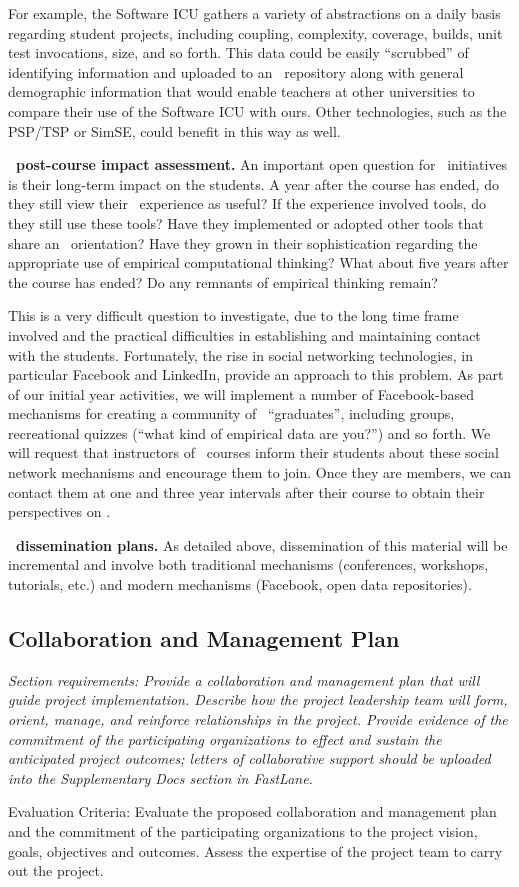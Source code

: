 For example, the Software ICU gathers a variety of abstractions on a daily
basis regarding student projects, including coupling, complexity, coverage,
builds, unit test invocations, size, and so forth.  This data could be
easily ``scrubbed'' of identifying information and uploaded to an \eCT\
repository along with general demographic information that would enable
teachers at other universities to compare their use of the Software ICU
with ours.  Other technologies, such as the PSP/TSP or SimSE, could benefit
in this way as well.

{\bf \eCT\ post-course impact assessment.}  An important open question for
\eCT\ initiatives is their long-term impact on the students.  A year after
the course has ended, do they still view their \eCT\ experience as useful?
If the experience involved tools, do they still use these tools?  Have they
implemented or adopted other tools that share an \eCT\ orientation?  Have
they grown in their sophistication regarding the appropriate use of
empirical computational thinking? What about five years after the course
has ended?  Do any remnants of empirical thinking remain?

This is a very difficult question to investigate, due to the long time
frame involved and the practical difficulties in establishing and
maintaining contact with the students.  Fortunately, the rise in social
networking technologies, in particular Facebook and LinkedIn, provide an approach to
this problem.  As part of our initial year activities, we will implement a
number of Facebook-based mechanisms for creating a community of \eCT\
``graduates'', including groups, recreational quizzes (``what kind of
empirical data are you?'') and so forth.  We will request that instructors
of \eCT\ courses inform their students about these social network
mechanisms and encourage them to join.  Once they are members, we can
contact them at one and three year intervals after their course to obtain
their perspectives on \eCT.

{\bf \eCT\ dissemination plans.}  As detailed above, dissemination of this
material will be incremental and involve both traditional mechanisms
(conferences, workshops, tutorials, etc.) and modern mechanisms (Facebook,
open data repositories).

\subsection{Collaboration and Management Plan}

{\em Section requirements: Provide a collaboration and management plan that
will guide project implementation.  Describe how the project leadership
team will form, orient, manage, and reinforce relationships in the project.
Provide evidence of the commitment of the participating organizations to
effect and sustain the anticipated project outcomes; letters of
collaborative support should be uploaded into the Supplementary Docs
section in FastLane.

Evaluation Criteria: Evaluate the proposed collaboration and management
plan and the commitment of the participating organizations to the project
vision, goals, objectives and outcomes.  Assess the expertise of the
project team to carry out the project.
}
\bigskip

